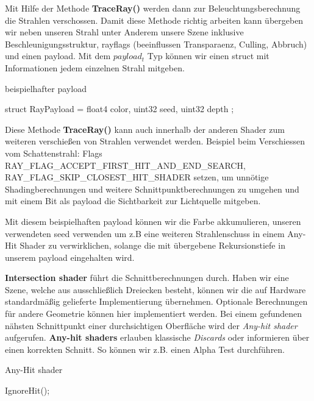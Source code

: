 Mit Hilfe der Methode \textbf{TraceRay()} werden dann zur Beleuchtungsberechnung 
die Strahlen verschossen. Damit diese Methode richtig arbeiten kann übergeben wir neben unseren Strahl 
unter Anderem  unsere Szene inklusive Beschleunigungsstruktur, rayflags 
(beeinflussen Transparaenz, Culling, Abbruch)\cite{RayFlags} und einen payload.
Mit dem \textit{$payload_t$} Typ können wir einen struct mit Informationen jedem einzelnen Strahl mitgeben.

\begin{algorithm}[H]
    \caption{beispielhafter payload}
    \begin{algorithmic}[1]
        \State struct RayPayload = {
            \State        float4 color, uint32 seed, uint32 depth
            \State };
        \end{algorithmic}
        \label{alg:payload}
    \end{algorithm}
    
Diese Methode \textbf{TraceRay()} kann auch innerhalb der anderen Shader zum weiteren verschießen
von Strahlen verwendet werden. Beispiel beim Verschiessen vom Schattenstrahl: Flags 
RAY\_FLAG\_ACCEPT\_FIRST\_HIT\_AND\_END\_SEARCH, \newline
RAY\_FLAG\_SKIP\_CLOSEST\_HIT\_SHADER setzen, um unnötige 
Shadingberechnungen und weitere Schnittpunktberechnungen zu umgehen und mit einem Bit als payload 
die Sichtbarkeit zur Lichtquelle mitgeben.


Mit diesem beispielhaften payload können wir die Farbe akkumulieren, unseren verwendeten 
seed verwenden um z.B eine weiteren Strahlenschuss in einem Any-Hit Shader zu verwirklichen,  
solange die mit übergebene Rekursionstiefe in unserem payload eingehalten wird.  

\textbf{Intersection shader} führt die Schnittberechnungen durch.
Haben wir eine Szene, welche aus ausschließlich Dreiecken besteht, können wir
die auf Hardware standardmäßig gelieferte Implementierung übernehmen. 
Optionale Berechnungen für andere Geometrie können hier implementiert werden.
Bei einem gefundenen nähsten Schnittpunkt einer durchsichtigen Oberfläche wird der 
\textit{Any-hit shader} aufgerufen.
\textbf{Any-hit shaders} erlauben klassische \textit{Discards} oder informieren
über einen korrekten Schnitt. So können wir z.B. einen Alpha Test durchführen.

\begin{algorithm}[H]
    \caption{Any-Hit shader}
    \begin{algorithmic}[1]
        \State IgnoreHit();
        \EndIf
    \end{algorithmic}
    \label{alg:any hit}
\end{algorithm}

